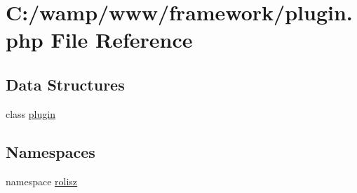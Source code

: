 \hypertarget{plugin_8php}{
\section{C:/wamp/www/framework/plugin.php File Reference}
\label{plugin_8php}
}
\subsection*{Data Structures}
\begin{DoxyCompactItemize}
\item 
class \hyperlink{classplugin}{plugin}
\end{DoxyCompactItemize}
\subsection*{Namespaces}
\begin{DoxyCompactItemize}
\item 
namespace \hyperlink{namespacerolisz}{rolisz}
\end{DoxyCompactItemize}
